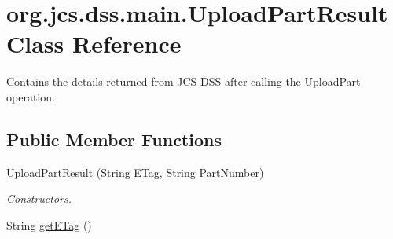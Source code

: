 \hypertarget{classorg_1_1jcs_1_1dss_1_1main_1_1UploadPartResult}{}\section{org.\+jcs.\+dss.\+main.\+Upload\+Part\+Result Class Reference}
\label{classorg_1_1jcs_1_1dss_1_1main_1_1UploadPartResult}


Contains the details returned from J\+CS D\+SS after calling the Upload\+Part operation.  


\subsection*{Public Member Functions}
\begin{DoxyCompactItemize}
\item 
\hyperlink{classorg_1_1jcs_1_1dss_1_1main_1_1UploadPartResult_a001e18c4de041601796e1ae95f91e4df}{Upload\+Part\+Result} (String E\+Tag, String Part\+Number)\hypertarget{classorg_1_1jcs_1_1dss_1_1main_1_1UploadPartResult_a001e18c4de041601796e1ae95f91e4df}{}\label{classorg_1_1jcs_1_1dss_1_1main_1_1UploadPartResult_a001e18c4de041601796e1ae95f91e4df}

\begin{DoxyCompactList}\small\item\em Constructors. \end{DoxyCompactList}\item 
String \hyperlink{classorg_1_1jcs_1_1dss_1_1main_1_1UploadPartResult_ac0fc2083d5786d1c6d6769849c249fb0}{get\+E\+Tag} ()\hypertarget{classorg_1_1jcs_1_1dss_1_1main_1_1UploadPartResult_ac0fc2083d5786d1c6d6769849c249fb0}{}\label{classorg_1_1jcs_1_1dss_1_1main_1_1UploadPartResult_ac0fc2083d5786d1c6d6769849c249fb0}


\end{DoxyCompactItemize}
